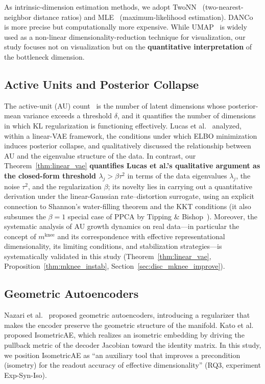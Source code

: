 \documentclass[make,article,submit,pdftex,moreauthors]{Definitions/mdpi}
\newcommand{\mknee}{m^{\mathrm{knee}}}
\begin{document}
As intrinsic-dimension estimation methods, we adopt
TwoNN~\cite{facco2017twonn} (two-nearest-neighbor distance ratios) and
MLE~\cite{levina2005mle} (maximum-likelihood estimation).
DANCo~\cite{ceruti2014danco} is more precise but computationally more expensive.
While UMAP~\cite{mcinnes2018umap} is widely used as a non-linear
dimensionality-reduction technique for visualization, our study focuses not on
visualization but on the \textbf{quantitative interpretation} of the bottleneck
dimension.

\subsection{Active Units and Posterior Collapse}\label{sec:related_au}

The active-unit (AU) count~\cite{lucas2019elbo,higgins2017betavae} is the
number of latent dimensions whose posterior-mean variance exceeds a threshold
$\delta$, and it quantifies the number of dimensions in which KL regularization
is functioning effectively.
Lucas et al.~\cite{lucas2019elbo} analyzed, within a linear-VAE framework, the
conditions under which ELBO minimization induces posterior collapse, and
qualitatively discussed the relationship between AU and the eigenvalue
structure of the data.
In contrast, our Theorem~\ref{thm:linear_vae} \textbf{quantifies Lucas et al.'s
qualitative argument as the closed-form threshold $\lambda_j > \beta\tau^2$}
in terms of the data eigenvalues $\lambda_j$, the noise $\tau^2$, and the
regularization $\beta$; its novelty lies in carrying out a quantitative
derivation under the linear-Gaussian rate--distortion surrogate, using an
explicit connection to Shannon's water-filling theorem and the KKT conditions
(it also subsumes the $\beta=1$ special case of PPCA by Tipping \&
Bishop~\cite{tippingbishop1999ppca}).
Moreover, the systematic analysis of AU growth dynamics on real data---in
particular the concept of $\mknee$ and its correspondence with effective
representational dimensionality, its limiting conditions, and stabilization
strategies---is systematically validated in this study
(Theorem~\ref{thm:linear_vae}, Proposition~\ref{thm:mknee_instab},
Section~\ref{sec:disc_mknee_improve}).

\subsection{Geometric Autoencoders}\label{sec:related_geo}

Nazari et al.~\cite{nazari2023geometric} proposed geometric autoencoders,
introducing a regularizer that makes the encoder preserve the geometric
structure of the manifold.
Kato et al.~\cite{kato2020rdae} proposed IsometricAE, which realizes an
isometric embedding by driving the pullback metric of the decoder Jacobian
toward the identity matrix.
In this study, we position IsometricAE as ``an auxiliary tool that improves a
precondition (isometry) for the readout accuracy of effective dimensionality''
(RQ3, experiment Exp-Syn-Iso).
\end{document}
